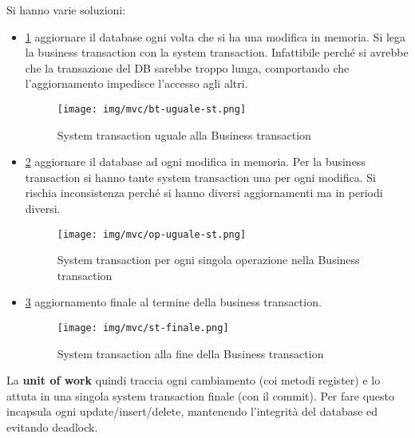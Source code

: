Si hanno varie soluzioni:
\begin{itemize}
      \item \ref{fig:bt-uguale-st} aggiornare il database ogni volta che si ha
            una modifica in memoria. Si lega la business transaction con la system
            transaction. Infattibile perché si avrebbe che la transazione del DB
            sarebbe troppo lunga, comportando che l'aggiornamento impedisce
            l'accesso agli altri.
            \begin{figure}[!ht]
                  \centering
                  \texttt{[image: img/mvc/bt-uguale-st.png]}
                  \caption{System transaction uguale alla Business transaction}
                  \label{fig:bt-uguale-st}
            \end{figure}
      \item \ref{fig:op-uguale-st} aggiornare il database ad ogni modifica in
            memoria. Per la business transaction si hanno tante system transaction
            una per ogni modifica. Si rischia inconsistenza perché si hanno
            diversi aggiornamenti ma in periodi diversi.
            \begin{figure}[!ht]
                  \centering
                  \texttt{[image: img/mvc/op-uguale-st.png]}
                  \caption{System transaction per ogni singola operazione nella Business
                        transaction}
                  \label{fig:op-uguale-st}
            \end{figure}
      \item \ref{fig:bt-uguale-st1} aggiornamento finale al termine della business
            transaction.
            \begin{figure}[!ht]
                  \centering
                  \texttt{[image: img/mvc/st-finale.png]}
                  \caption{System transaction alla fine della Business transaction}
                  \label{fig:bt-uguale-st1}
            \end{figure}
\end{itemize}
La \textbf{unit of work} quindi traccia ogni cambiamento (coi metodi register) e
lo attuta in una singola system transaction finale (con il commit). Per fare questo
incapsula ogni update/insert/delete, mantenendo l'integrità del database ed
evitando deadlock.

